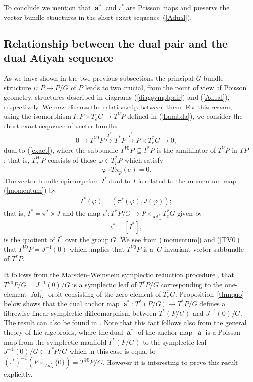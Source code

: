 \documentclass[pdftex]{sigma}
\renewcommand{\to}{\rightarrow}
\DeclareMathOperator{\Ad}{Ad}
\DeclareMathOperator{\anch}{\mathbf{a}}
\newcommand{\ann}{0}
\numberwithin{equation}{section}
\begin{document}
To conclude we mention that $\anch^*$ and $\iota^*$ are Poisson maps and preserve the vector bundle structures in the short exact sequence~(\ref{Adual}).

\subsection{Relationship between the dual pair and the dual Atiyah sequence}
As we have shown in the two previous subsections the principal $G$-bundle structure $\mu\colon P\to P/G$ of $P$ leads to two crucial, from the point of view of Poisson geometry, structures described in diagrams (\ref{diagsymplpair}) and (\ref{Adual}), respectively. We now discuss the relationship between them. For this reason, using the isomorphism $I\colon P\times T_eG\to T^VP $ def\/ined in (\ref{Lambda}), we consider the short exact sequence of vector bundles
\begin{gather*}%
0\to T^{V0}P\stackrel{A^*}{\hookrightarrow} T^*P\stackrel{I^*}{\longrightarrow}P\times T_e^*G\to 0,\end{gather*}
dual to (\ref{exact}), where the subbundle $T^{V\ann}P\subseteq T^* P$ is the annihilator of $T^VP$ in $TP$;
that is, $T_p^{V\ann}P$ consists of those $\varphi\in T^*_p P$ which satisfy
\begin{gather}\label{TV0}
\varphi\circ T\kappa_p(e)=0.
\end{gather}
The vector bundle epimorphism $I^*$ dual to $I$ is related to the momentum map (\ref{momentum}) by
\begin{gather*}%
I^*(\varphi)=(\pi^*(\varphi),J(\varphi));\end{gather*}
that is, $I^*=\pi^*\times J$ and the map $\iota^*\colon T^*P/G\to P\times _{\Ad_G^*}T_e^*G$ given by
\begin{gather*}%
\iota^*=[I^*],\end{gather*}
is the quotient of $I^*$ over the group $G$. We see from (\ref{momentum}) and (\ref{TV0}) that $T^{V0}P=J^{-1}(0)$ which implies that $T^{V0}P$ is a~$G$-invariant vector subbundle of $T^*P$.

It follows from the Marsden--Weinstein symplectic reduction procedure \cite{MW}, that $T^{V0}P/G=J^{-1}(0)/G$ is a symplectic leaf of $T^*P/G$ corresponding to the one-element $\Ad_G^*$-orbit consisting of the zero element of $T^*_eG$. Proposition~\ref{thmquo} below shows that the dual anchor map $\anch^*\colon T^*(P/G)\to T^*P/G$ def\/ines a f\/ibrewise linear symplectic dif\/feomorphism between $T^*(P/G)$ and $J^{-1}(0)/G$. The result can also be found in \cite[Lemma~5.4]{ReymanSTS}. Note that this fact follows also from the general theory of Lie algebroids, where the dual $\anch^*$ of the anchor map~$\anch$ is a Poisson map from the symplectic manifold $T^*(P/G)$ to the symplectic leaf $J^{-1}(0)/G\subset T^*P/G$ which in this case is equal to $(\iota^*)^{-1}(P\times_{Ad^*_G} \{0\}) = T^{V0}P/G$. However it is interesting to prove this result explicitly.
\end{document}
